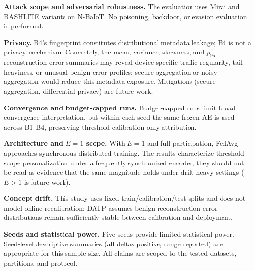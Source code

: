 \textbf{Attack scope and adversarial robustness.}
The evaluation uses Mirai and BASHLITE variants on N-BaIoT.
No poisoning, backdoor, or evasion evaluation is performed.

\textbf{Privacy.}
B4's fingerprint constitutes distributional metadata leakage; B4 is not a privacy mechanism.
Concretely, the mean, variance, skewness, and $p_{95}$ reconstruction-error summaries may
reveal device-specific traffic regularity, tail heaviness, or unusual benign-error profiles;
secure aggregation or noisy aggregation would reduce this metadata exposure.
Mitigations (secure aggregation, differential privacy) are future work.

\textbf{Convergence and budget-capped runs.}
Budget-capped runs limit broad convergence interpretation, but within each seed the
same frozen AE is used across B1--B4, preserving threshold-calibration-only attribution.

\textbf{Architecture and $E{=}1$ scope.}
With $E{=}1$ and full participation, FedAvg approaches synchronous distributed training.
The results characterize threshold-scope personalization under a frequently
synchronized encoder; they should not be read as evidence that the same magnitude
holds under drift-heavy settings ($E>1$ is future work).

\textbf{Concept drift.}
This study uses fixed train/calibration/test splits and does not model online
recalibration; DATP assumes benign reconstruction-error distributions remain
sufficiently stable between calibration and deployment.

\textbf{Seeds and statistical power.}
Five seeds provide limited statistical power.
Seed-level descriptive summaries (all deltas positive, range reported) are appropriate
for this sample size.
All claims are scoped to the tested datasets, partitions, and protocol.
